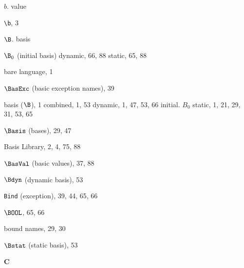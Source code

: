 \begin{theindex}
\indexspace
\item $b$. \see value 
\item \verb+\b+, 3 
\item $\B$. \see basis 
\item $\B_0$ (initial basis) 
\subitem dynamic, 66, 88
\subitem static, 65, 88
\item bare language, 1
\item $\BasExc$ (basic exception names), 39
\item basis ($\B$), 1
\subitem combined, 1, 53
\subitem dynamic, 1, 47, 53, 66
\subitem initial. \see $B_0$
\subitem static, 1, 21, 29, 31, 53, 65
\item $\Basis$ (bases), 29, 47
\item Basis Library, 2, 4, 75, 88
\item $\BasVal$ (basic values), 37, 88
\item $\Bdyn$ (dynamic basis), 53
\item {\tt Bind} (exception), 39, 44, 65, 66
\item $\BOOL$, 65, 66
\item bound names, 29, 30
\item $\Bstat$ (static basis), 53
\indexspace

\parbox{64mm}{\hfil{\large\bf C}\hfil}

\indexspace


\end{theindex}
